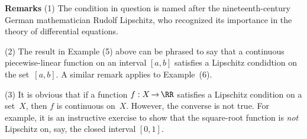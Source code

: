 \V

        {\bf Remarks} (1) The condition in question is named after the nineteenth-century German mathematician Rudolf Lipschitz,
    who recognized its importance in the theory of differential equations.

\V

        (2) The result in Example (5) above can be phrased to say that a continuous piecewise-linear function on an interval $[a,b]$ satisfies a Lipschitz condidtion on the set~$[a,b]$.
    A similar remark applies to Example~(6).

\V

        (3) It is obvious that if a function $f:X \,{\rightarrow}\, {\RR}$ satisfies a Lipschitz condition on a set~$X$, then $f$ is continuous on~$X$.
    However, the converse is not true. For example, it is an instructive exercise to show that
    the square-root function is {\em not} Lipschitz on, say, the closed interval $[0,1]$. %

\VV

